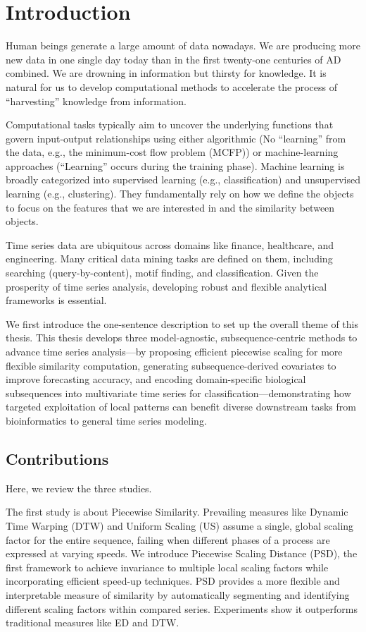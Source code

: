 \chapter{Introduction} \label{ch:introduction}

Human beings generate a large amount of data nowadays.
We are producing more new data in one single day today than in the first twenty-one centuries of AD combined.
We are drowning in information but thirsty for knowledge.
It is natural for us to develop computational methods to accelerate the process of ``harvesting'' knowledge from information.

Computational tasks typically aim to uncover the underlying functions that govern input-output relationships using either algorithmic (No ``learning'' from the data, e.g., the minimum-cost flow problem (MCFP)) or machine-learning approaches (``Learning'' occurs during the training phase).
%
Machine learning is broadly categorized into supervised learning (e.g., classification) and unsupervised learning (e.g., clustering). 
They fundamentally rely on how we define the objects to focus on the features that we are interested in and the similarity between objects.

Time series data are ubiquitous across domains like finance, healthcare, and engineering. Many critical data mining tasks are defined on them, including searching (query-by-content), motif finding, and classification. Given the prosperity of time series analysis, developing robust and flexible analytical frameworks is essential.

We first introduce the one-sentence description to set up the overall theme of this thesis.
This thesis develops three model-agnostic, subsequence-centric methods to advance time series analysis—by 
proposing efficient piecewise scaling for more flexible similarity computation, 
generating subsequence-derived covariates to improve forecasting accuracy, 
and encoding domain-specific biological subsequences into multivariate time series for classification—demonstrating 
how targeted exploitation of local patterns can benefit diverse downstream tasks from bioinformatics to general time series modeling.

\section{Contributions}

Here, we review the three studies.

The first study is about Piecewise Similarity.
%
Prevailing measures like Dynamic Time Warping (DTW) and Uniform Scaling (US) assume a single, global scaling factor for the entire sequence, failing when different phases of a process are expressed at varying speeds.
%
We introduce Piecewise Scaling Distance (PSD), the first framework to achieve invariance to multiple local scaling factors while incorporating efficient speed-up techniques.
%
PSD provides a more flexible and interpretable measure of similarity by automatically segmenting and identifying different scaling factors within compared series. Experiments show it outperforms traditional measures like ED and DTW.

